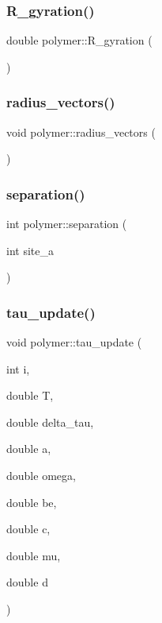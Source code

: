 \hypertarget{classpolymer_aea38306aefc9608092464ae7f402a2d7}{}\label{classpolymer_aea38306aefc9608092464ae7f402a2d7} 
\subsubsection{\texorpdfstring{R\+\_\+gyration()}{R\_gyration()}}
{\footnotesize\ttfamily double polymer\+::\+R\+\_\+gyration (\begin{DoxyParamCaption}{ }\end{DoxyParamCaption})}

\hypertarget{classpolymer_a914b3abcbc6c53907626193ee21169ac}{}\label{classpolymer_a914b3abcbc6c53907626193ee21169ac} 
\subsubsection{\texorpdfstring{radius\+\_\+vectors()}{radius\_vectors()}}
{\footnotesize\ttfamily void polymer\+::radius\+\_\+vectors (\begin{DoxyParamCaption}{ }\end{DoxyParamCaption})}

\hypertarget{classpolymer_ab001df23489a33c37e4dbe2f62cd4497}{}\label{classpolymer_ab001df23489a33c37e4dbe2f62cd4497} 
\subsubsection{\texorpdfstring{separation()}{separation()}}
{\footnotesize\ttfamily int polymer\+::separation (\begin{DoxyParamCaption}\item[{int}]{site\+\_\+a }\end{DoxyParamCaption})}

\hypertarget{classpolymer_af95590e5cd7bfc6b5739b60d6e95bc5e}{}\label{classpolymer_af95590e5cd7bfc6b5739b60d6e95bc5e} 
\subsubsection{\texorpdfstring{tau\+\_\+update()}{tau\_update()}}
{\footnotesize\ttfamily void polymer\+::tau\+\_\+update (\begin{DoxyParamCaption}\item[{int}]{i,  }\item[{double}]{T,  }\item[{double}]{delta\+\_\+tau,  }\item[{double}]{a,  }\item[{double}]{omega,  }\item[{double}]{be,  }\item[{double}]{c,  }\item[{double}]{mu,  }\item[{double}]{d }\end{DoxyParamCaption})}

